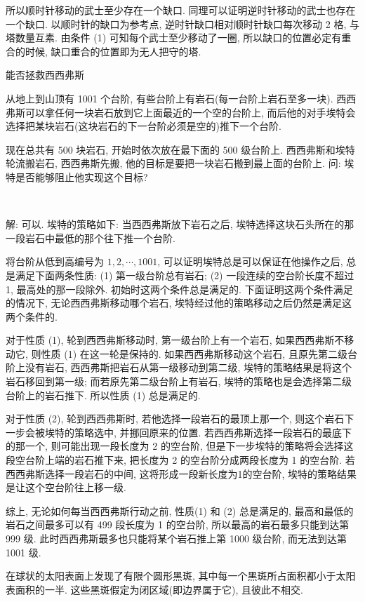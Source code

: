 所以顺时针移动的武士至少存在一个缺口. 同理可以证明逆时针移动的武士也存在一个缺口. 以顺时针的缺口为参考点, 逆时针缺口相对顺时针缺口每次移动 2 格, 与塔数量互素. 由条件 (1) 可知每个武士至少移动了一圈, 所以缺口的位置必定有重合的时候, 缺口重合的位置即为无人把守的塔.


\newpage
\noindent 能否拯救西西弗斯

从地上到山顶有 1001 个台阶, 有些台阶上有岩石(每一台阶上岩石至多一块). 西西弗斯可以拿任何一块岩石放到它上面最近的一个空的台阶上, 而后他的对手埃特会选择把某块岩石(这块岩石的下一台阶必须是空的)推下一个台阶.

现在总共有 500 块岩石, 开始时依次放在最下面的 500 级台阶上. 西西弗斯和埃特轮流搬岩石, 西西弗斯先搬, 他的目标是要把一块岩石搬到最上面的台阶上. 问: 埃特是否能够阻止他实现这个目标?

~

解: 可以. 埃特的策略如下: 当西西弗斯放下岩石之后, 埃特选择这块石头所在的那一段岩石中最低的那个往下推一个台阶.

将台阶从低到高编号为 $1,2,\cdots,1001$, 可以证明埃特总是可以保证在他操作之后, 总是满足下面两条性质: (1) 第一级台阶总有岩石; (2) 一段连续的空台阶长度不超过 1, 最高处的那一段除外. 初始时这两个条件总是满足的. 下面证明这两个条件满足的情况下, 无论西西弗斯移动哪个岩石, 埃特经过他的策略移动之后仍然是满足这两个条件的.

对于性质 (1), 轮到西西弗斯移动时, 第一级台阶上有一个岩石, 如果西西弗斯不移动它, 则性质 (1) 在这一轮是保持的. 如果西西弗斯移动这个岩石, 且原先第二级台阶上没有岩石, 西西弗斯把岩石从第一级移动到第二级, 埃特的策略结果是将这个岩石移回到第一级; 而若原先第二级台阶上有岩石, 埃特的策略也是会选择第二级台阶上的岩石推下. 所以性质 (1) 总是满足的.

对于性质 (2), 轮到西西弗斯时, 若他选择一段岩石的最顶上那一个, 则这个岩石下一步会被埃特的策略选中, 并挪回原来的位置. 若西西弗斯选择一段岩石的最底下的那一个, 则可能出现一段长度为 2 的空台阶, 但是下一步埃特的策略将会选择这段空台阶上端的岩石推下来, 把长度为 2 的空台阶分成两段长度为 1 的空台阶. 若西西弗斯选择一段岩石的中间, 这将形成一段新长度为1的空台阶, 埃特的策略结果是让这个空台阶往上移一级.

综上, 无论如何每当西西弗斯行动之前, 性质(1) 和 (2) 总是满足的, 最高和最低的岩石之间最多可以有 499 段长度为 1 的空台阶, 所以最高的岩石最多只能到达第 999 级. 此时西西弗斯最多也只能将某个岩石推上第 1000 级台阶, 而无法到达第 1001 级.


\newpage
在球状的太阳表面上发现了有限个圆形黑斑, 其中每一个黑斑所占面积都小于太阳表面积的一半. 这些黑斑假定为闭区域(即边界属于它), 且彼此不相交.

